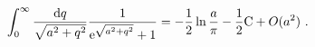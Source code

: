 \begin{equation}\int_0^{\infty} \frac{{\rm d}q}{\sqrt{a^2+q^2}}
\frac{1}{{\rm e}^{\sqrt{a^2+q^2}}+1}
 = -\frac{1}{2}\ln \frac{a}{\pi}-\frac{1}{2} {\rm C}
+ O(a^2) \ .
\label{t32}
\end{equation}

